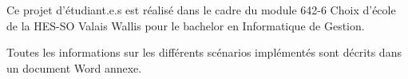 Ce projet d'étudiant.e.s est réalisé dans le cadre du module 642-6 Choix d'école de la HES-SO Valais Wallis pour le bachelor en Informatique de Gestion.

Toutes les informations sur les différents scénarios implémentés sont décrits dans un document Word annexe.
